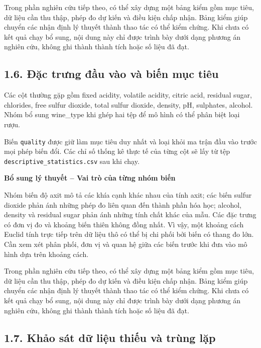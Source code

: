 \documentclass[12pt,a4paper,oneside]{article}
\begin{document}
Trong phần nghiên cứu tiếp theo, có thể xây dựng một bảng kiểm gồm mục tiêu, dữ liệu cần thu thập, phép đo dự kiến và điều kiện chấp nhận. Bảng kiểm giúp chuyển các nhận định lý thuyết thành thao tác có thể kiểm chứng. Khi chưa có kết quả chạy bổ sung, nội dung này chỉ được trình bày dưới dạng phương án nghiên cứu, không ghi thành thành tích hoặc số liệu đã đạt.\par

\subsection*{1.6. Đặc trưng đầu vào và biến mục tiêu}

Các cột thường gặp gồm fixed acidity, volatile acidity, citric acid,
residual sugar, chlorides, free sulfur dioxide, total sulfur dioxide,
density, pH, sulphates, alcohol. Nhóm bổ sung wine\_type khi ghép hai
tệp để mô hình có thể phân biệt loại rượu.

Biến \texttt{quality} được giữ làm mục tiêu duy nhất và loại khỏi ma
trận đầu vào trước mọi phép biến đổi. Các chỉ số thống kê thực tế của
từng cột sẽ lấy từ tệp \texttt{descriptive\_statistics.csv} sau khi
chạy.


\par\noindent\textbf{Bổ sung lý thuyết -- Vai trò của từng nhóm biến}\par
Nhóm biến độ axit mô tả các khía cạnh khác nhau của tính axit; các biến sulfur dioxide phản ánh những phép đo liên quan đến thành phần hóa học; alcohol, density và residual sugar phản ánh những tính chất khác của mẫu. Các đặc trưng có đơn vị đo và khoảng biến thiên không đồng nhất. Vì vậy, một khoảng cách Euclid tính trực tiếp trên dữ liệu thô có thể bị chi phối bởi biến có thang đo lớn. Cần xem xét phân phối, đơn vị và quan hệ giữa các biến trước khi đưa vào mô hình dựa trên khoảng cách.\par

Trong phần nghiên cứu tiếp theo, có thể xây dựng một bảng kiểm gồm mục tiêu, dữ liệu cần thu thập, phép đo dự kiến và điều kiện chấp nhận. Bảng kiểm giúp chuyển các nhận định lý thuyết thành thao tác có thể kiểm chứng. Khi chưa có kết quả chạy bổ sung, nội dung này chỉ được trình bày dưới dạng phương án nghiên cứu, không ghi thành thành tích hoặc số liệu đã đạt.\par

\subsection*{1.7. Khảo sát dữ liệu thiếu và trùng lặp}
\end{document}
